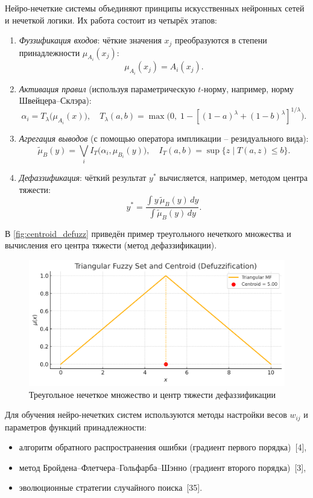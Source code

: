 Нейро-нечеткие системы объединяют принципы искусственных нейронных сетей и
нечеткой логики. Их работа состоит из четырёх этапов:

\begin{enumerate}
  \item \emph{Фуззификация входов}:
    чёткие значения \(x_j\) преобразуются в степени принадлежности
    \(\mu_{A_i}(x_j)\):
    \[
      \mu_{A_i}(x_j) = A_i(x_j).
    \]
  \item \emph{Активация правил} (используя параметрическую \(t\)-норму,
    например, норму Швейцера–Склэра):
    \[
      \alpha_i
      = T_{\lambda}\bigl(\mu_{A_i}(x)\bigr),
      \quad
      T_{\lambda}(a,b)
      = \max\!\bigl(0,\;1-[(1-a)^\lambda + (1-b)^\lambda]^{1/\lambda}\bigr).
    \]
  \item \emph{Агрегация выводов} (с помощью оператора импликации –
    резидуального вида):
    \[
      \tilde{\mu}_B(y)
      = \bigvee_i I_T\bigl(\alpha_i,\mu_{B_i}(y)\bigr),
      \quad
      I_T(a,b)
      = \sup\{z\mid T(a,z)\le b\}.
    \]
  \item \emph{Дефаззификация}: чёткий результат \(y^*\) вычисляется, например,
    методом центра тяжести:
    \[
      y^*
      = \frac{\displaystyle \int y\,\tilde{\mu}_B(y)\,dy}
             {\displaystyle \int \tilde{\mu}_B(y)\,dy}.
    \]
\end{enumerate}

В \autoref{fig:centroid_defuzz} приведён пример треугольного нечеткого множества
и вычисления его центра тяжести (метод дефаззификации).

\begin{figure}[ht]
  \centering
  \includegraphics[width=\textwidth]{images/centroid_plot.png}
  \caption{Треугольное нечеткое множество и центр тяжести дефаззификации}
  \label{fig:centroid_defuzz}
\end{figure}

Для обучения нейро-нечетких систем используются методы настройки
весов \(w_{ij}\) и параметров функций принадлежности:
\begin{itemize}
  \item алгоритм обратного распространения ошибки (градиент первого порядка)~[4],
  \item метод Бройдена–Флетчера–Гольфарба–Шэнно (градиент второго порядка)~[3],
  \item эволюционные стратегии случайного поиска~[35].
\end{itemize}

